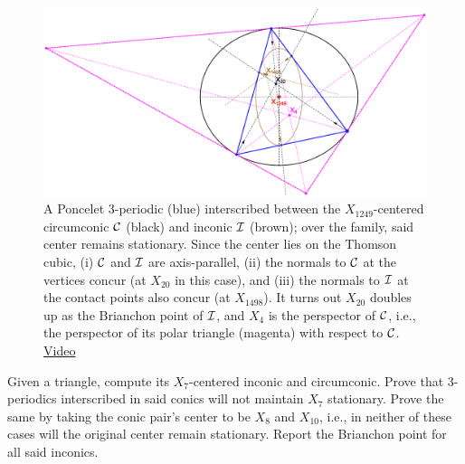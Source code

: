 \begin{figure}
    \centering
    \includegraphics[width=\textwidth]{chap_03/pics/pics_03_315_poncelet_x1249.eps}
    \caption{A Poncelet 3-periodic (blue) interscribed between the $X_{1249}$-centered circumconic $\mathcal{C}$ (black) and inconic $\mathcal{I}$ (brown); over the family, said center remains stationary. Since the center lies on the Thomson cubic, (i) $\mathcal{C}$ and $\mathcal{I}$ are axis-parallel, (ii) the normals to $\mathcal{C}$ at the vertices concur (at $X_{20}$ in this case), and (iii) the normals to $\mathcal{I}$ at the contact points also concur (at $X_{1498}$). It turns out $X_{20}$ doubles up as the Brianchon point of $\mathcal{I}$, and $X_4$ is the perspector of $\mathcal{C}$, i.e., the perspector of its polar triangle (magenta) with respect to $\mathcal{C}$. \href{https://youtu.be/QQSN\_ndDJQk}{Video}}
    \label{fig:03-x1249}
\end{figure}

\begin{question}
Given a triangle, compute its $X_7$-centered inconic and circumconic. Prove that 3-periodics interscribed in said conics will not maintain $X_7$ stationary. Prove the same by taking the conic pair's center to be $X_8$ and $X_{10}$, i.e., in neither of these cases will the original center remain stationary. Report the Brianchon point for all said inconics.
\label{que:03-x7}
\end{question}


